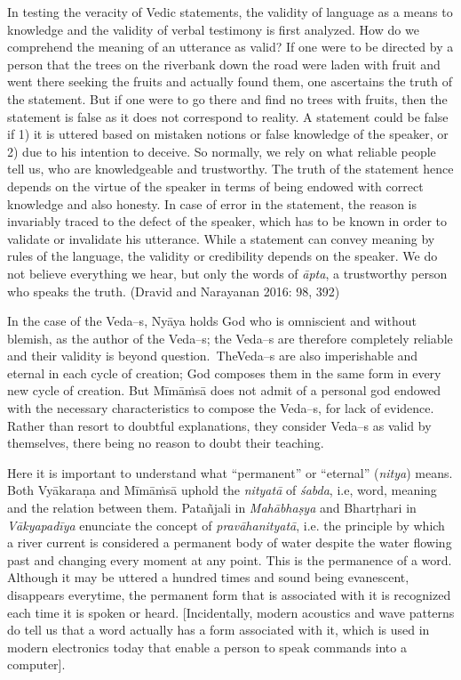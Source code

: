 In testing the veracity of Vedic statements, the validity of language as a means to knowledge and the validity of verbal testimony is first analyzed. How do we comprehend the meaning of an utterance as valid? If one were to be directed by a person that the trees on the riverbank down the road were laden with fruit and went there seeking the fruits and actually found them, one ascertains the truth of the statement. But if one were to go there and find no trees with fruits, then the statement is false as it does not correspond to reality. A statement could be false if 1) it is uttered based on mistaken notions or false knowledge of the speaker, or 2) due to his intention to deceive. So normally, we rely on what reliable people tell us, who are knowledgeable and trustworthy. The truth of the statement hence depends on the virtue of the speaker in terms of being endowed with correct knowledge and also honesty. In case of error in the statement, the reason is invariably traced to the defect of the speaker, which has to be known in order to validate or invalidate his utterance. While a statement can convey meaning by rules of the language, the validity or credibility depends on the speaker. We do not believe everything we hear, but only the words of \textit{āpta}, a trustworthy person who speaks the truth. (Dravid and Narayanan 2016: 98, 392)

In the case of the Veda--s, Nyāya holds God who is omniscient and without blemish, as the author of the Veda--s; the Veda--s are therefore completely reliable and their validity is beyond question.~The\break Veda--s are also imperishable and eternal in each cycle of creation; God composes them in the same form in every new cycle of creation. But Mīmāṁsā does not admit of a personal god endowed with the necessary characteristics to compose the Veda--s, for lack of evidence. Rather than resort to doubtful explanations, they consider Veda--s as valid by themselves, there being no reason to doubt their teaching.

Here it is important to understand what “permanent” or “eternal” (\textit{nitya}) means. Both {Vyākaraṇa} and Mīmāṁsā uphold the \textit{nityatā} of \textit{śabda}, i.e, word, meaning and the relation between them. Patañjali in \textit{Mahābhaṣya} and Bhartṛhari in \textit{Vākyapadīya} enunciate the concept of \textit{pravāhanityatā}, i.e. the principle by which a river current is considered a permanent body of water despite the water flowing past and changing every moment at any point. This is the permanence of a word. Although it may be uttered a hundred times and sound being evanescent, disappears everytime, the permanent form that is associated with it is recognized each time it is spoken or heard. [Incidentally, modern acoustics and wave patterns do tell us that a word actually has a form associated with it, which is used in modern electronics today that enable a person to speak commands into a computer].

